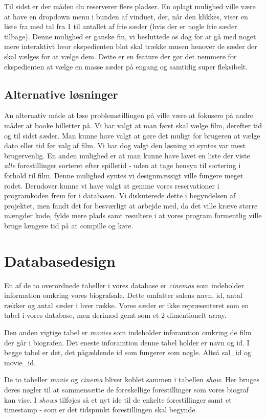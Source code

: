 \documentclass[final]{report}
\begin{document}
Til sidst er der måden du reserverer flere pladser. En oplagt mulighed ville være at have en dropdown menu i bunden af vinduet, der, når den klikkes, viser en liste fra med tal fra 1 til antallet af frie sæder (hvis der er nogle frie sæder tilbage). Denne mulighed er ganske fin, vi besluttede os dog for at gå med noget mere interaktivt hvor ekspedienten blot skal trække musen henover de sæder der skal vælges for at vælge dem. Dette er en feature der gør det nemmere for ekspedienten at vælge en masse sæder på engang og samtidig super fleksibelt. 


\subsection{Alternative løsninger}
An alternativ måde at løse problemstillingen på ville være at fokusere på andre måder at booke billetter på. Vi har valgt at man først skal vælge film, derefter tid og til sidst sæder. Man kunne have valgt at gøre det muligt for brugeren at vælge dato eller tid før valg af film. Vi har dog valgt den løsning vi syntes var mest brugervenlig. En anden mulighed er at man kunne have lavet en liste der viste \emph{alle} forestillinger sorteret efter spilletid - uden at tage hensyn til sortering i forhold til film. Denne mulighed syntes vi designmæssigt ville fungere meget rodet. Derudover kunne vi have valgt at gemme vores reservationer i programkoden frem for i databasen. Vi diskuterede dette i begyndelsen af projektet, men fandt det for besværligt at arbejde med, da det ville kræve større mængder kode, fylde mere plads samt resultere i at vores program formentlig ville bruge længere tid på at compille og køre.

\section{Databasedesign}
En af de to overordnede tabeller i vores database er \emph{cinemas} som indeholder information omkring vores biografsale. Dette omfatter salens navn, id, antal rækker og antal sæder i hver række. Vores sæder er ikke repræsenteret som en tabel i vores database, men derimod gemt som et 2 dimentionelt array. 

Den anden vigtige tabel er \emph{movies} som indeholder inforamtion omkring de film der går i biografen. Det eneste inforamtion denne tabel holder er navn og id. I begge tabel er det, det pågældende id som fungerer som nøgle. Altså sal\_id og movie\_id.  

De to tabeller \emph{movie} og \emph{cinema} bliver koblet sammen i tabellen \emph{show}. Her bruges deres nøgler til at sammensætte de foreskellige forestillinger som vores biograf kan vise. I \emph{shows} tilføjes så et nyt ide til de enkelte forestillinger samt et timestamp - som er det tidspunkt forestillingen skal begynde.
\end{document}
